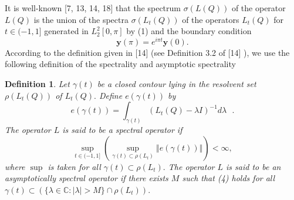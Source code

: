 \documentclass{article}%
\newtheorem{definition}{Definition}
\begin{document}
It is well-known [7, 13, 14, 18] that the spectrum $\sigma(L(Q))$ of the
operator $L(Q)$ is the union of the spectra $\sigma(L_{t}(Q))$ of the
operators $L_{t}(Q)$ for $t\in(-1,1]$ generated in $L_{2}^{2}[0,\pi]$ by (1)
and the boundary condition
\begin{equation}
\mathbf{y}(\pi)=e^{i\pi t}\mathbf{y}(0). \tag{3}%
\end{equation}
According to the definition given in [14] (see Definition 3.2 of [14] ), we
use the following definition of the spectrality and asymptotic spectrality

\begin{definition}
Let $\gamma(t)$ be a closed contour lying in the resolvent set $\rho\left(
L_{t}(Q)\right)  $ of $L_{t}(Q).$ Define $e(\gamma(t))$ by
\[
e(\gamma(t))=\int_{\gamma(t)}\left(  L_{t}(Q)-\lambda I\right)  ^{-1}%
d\lambda\text{ }.
\]
The operator $L$ is said to be a spectral operator if
\begin{equation}
\sup_{t\in(-1,1]}\left(  \sup_{\gamma(t)\subset\rho\left(  L_{t}\right)
}\left\Vert e(\gamma(t))\right\Vert \right)  <\infty, \tag{4}%
\end{equation}
where $\sup$ is taken for all $\gamma(t)\subset\rho\left(  L_{t}\right)  .$
The operator $L$ is said to be an asymptotically spectral operator if there
exists $M$ such that (4) holds for all $\gamma(t)\subset\left(  \{\lambda
\in\mathbb{C}:\mid\lambda\mid>M\}\cap\rho\left(  L_{t}\right)  \right)  .$
\end{definition}
\end{document}
